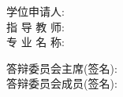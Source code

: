 ﻿%
%
%
\thispagestyle{empty}
\vspace*{20pt}
\begin{center}
   {\hei{}}
\end{center}
\vspace{2cm}
\begin{center}
   {\song\erhao\textbf \ctitle}
\end{center}
\begin{center}
   {\hei\sanhao\bf{\etitle}}
\end{center}
\vspace*{2cm}

{\sihao\kai
\begin{center}
学位申请人: \underline{\hspace{1.7cm}\cauthor\hspace{1.7cm}}\medskip\\
指\,\,导\,\,教\,\,师: \underline{\hspace{1.2cm}\supervisor\hspace{1.2cm}}\medskip \\
专\,\,业\,\,名\,\,称: \underline{\hspace{1.5cm}\major\hspace{1.5cm}}\medskip\\
\end{center}

\vspace{1.5cm}
\begin{center}
答辩委员会主席(签名): \underline{\hspace{5cm}}\medskip\\
答辩委员会成员(签名): \underline{\hspace{5cm}}\medskip\\
\hspace{51mm}\underline{\hspace{5cm}}\medskip\\
\hspace{51mm}\underline{\hspace{5cm}}\medskip\\
\hspace{51mm}\underline{\hspace{5cm}}\medskip\\
\hspace{51mm}\underline{\hspace{5cm}}\medskip\\
\end{center}}

\vspace{1.5cm}

\begin{center}
  {\sihao\finishdate}
\end{center}
